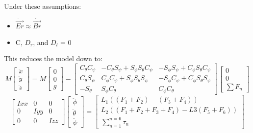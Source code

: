 \documentclass[12pt,a4paper,twoside]{report}
\begin{document}
			Under these assumptions:
			\begin{itemize}
				\item
					$\ddot{\vec{Er}} \approx \dot{\vec{Br}} $
				\item
					C, $D_r$, and $D_l$ = 0
			\end{itemize}
			\space
			This reduces the model down to:
			\begin{equation}
				M 
				\begin{bmatrix}
				\ddot{x} \\
				\ddot{y} \\
				\ddot{z}
				\end{bmatrix}
				=
				M 
				\begin{bmatrix}
				0 \\
				0 \\
				g
				\end{bmatrix}
				-
				\begin{bmatrix}
				C_\theta C_\psi & -C_\theta S_\psi + S_\phi S_\theta C_\psi & -S_\phi S_\psi + C_\phi S_\theta C_\psi \\
				C_\theta S_\psi &  C_\phi C_\psi + S_\phi S_\theta S_\psi   & -S_\phi C_\psi + C_\phi S_\theta S_\psi \\
				-S_\theta       &  S_\phi C_\theta                          &  C_\phi C_\theta
				\end{bmatrix}
				\begin{bmatrix}
				0 \\
				0 \\
				\sum F_n 
				\end{bmatrix}
			\end{equation} 
			\begin{equation} 
				\begin{bmatrix}
				Ixx & 0 & 0 \\
				0 & Iyy & 0 \\
				0 & 0 & Izz
				\end{bmatrix}
				\begin{bmatrix}
				\ddot{\phi} \\
				\ddot{\theta} \\
				\ddot{\psi}
				\end{bmatrix}
				=
				\begin{bmatrix}
				L_1 ((F_1+F_2) - (F_3+F_4)) \\
				L_2 ((F_1+F_2+F_3+F_4) - L3 (F_5+F_6)) \\
				\sum_{n = 1}^{n = 6}\tau_n
				\end{bmatrix}
			\end{equation}
\end{document}
